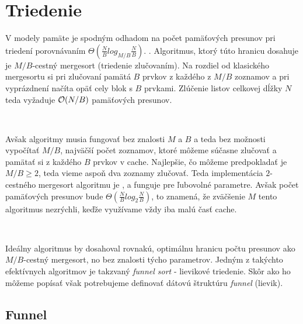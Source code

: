 


\section{Triedenie}

V \aware modely pamäte je spodným odhadom na počet pamäťových presunov pri triedení porovnávaním $\Theta(\frac{N}{B}log_{M/B}\frac{N}{B})$. \citep{AggVitt88, Demaine02}. Algoritmus, ktorý túto hranicu dosahuje je $M/B$-cestný mergesort (triedenie zlučovaním). Na rozdiel od klasického mergesortu si pri zlučovaní pamätá $B$ prvkov z každého z $M/B$ zoznamov a pri vyprázdnení načíta opäť cely blok s $B$ prvkami. Zlúčenie listov celkovej dĺžky $N$ teda vyžaduje $\mathcal{O}(N/B)$ pamäťových presunov.

\

Avšak \obliv algoritmy musia fungovať bez znalosti $M$ a $B$ a teda bez možnosti vypočítať $M/B$, najväčší počet zoznamov, ktoré môžeme súčasne zlučovať a pamätať si z každého $B$ prvkov v cache. Najlepšie, čo môžeme predpokladať je $M/B \ge 2$, teda vieme aspoň dva zoznamy zlučovať. Teda implementácia $2$-cestného mergesort algoritmu je \obliv, a funguje pre ľubovolné parametre. Avšak počet pamäťových presunov bude $\Theta(\frac{N}{B}log_{2}\frac{N}{B})$, to znamená, že zväčšenie $M$ tento algoritmus nezrýchli, keďže využívame vždy iba malú časť cache. 

\

Ideálny \obliv algoritmus by dosahoval rovnakú, optimálnu hranicu počtu presunov ako $M/B$-cestný mergesort, no bez znalosti týcho parametrov. Jedným z takýchto efektívnych \obliv algoritmov je takzvaný {\em funnel sort} - lievikové triedenie. Skôr ako ho môžeme popísať však potrebujeme definovať dátovú štruktúru {\em funnel} (lievik).

\subsection{Funnel}

